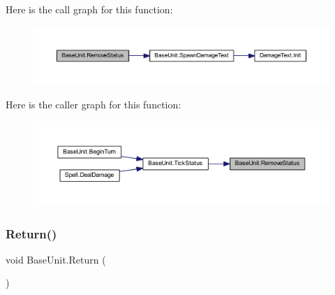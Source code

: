Here is the call graph for this function\+:
\nopagebreak
\begin{figure}[H]
\begin{center}
\leavevmode
\includegraphics[width=350pt]{class_base_unit_a15cf13fa9b4b776f474ad03b42939139_cgraph}
\end{center}
\end{figure}
Here is the caller graph for this function\+:
\nopagebreak
\begin{figure}[H]
\begin{center}
\leavevmode
\includegraphics[width=350pt]{class_base_unit_a15cf13fa9b4b776f474ad03b42939139_icgraph}
\end{center}
\end{figure}
\mbox{\label{class_base_unit_a3091e5ab7a6bd3488f9c0987208a1f4d}} 
\subsubsection{\texorpdfstring{Return()}{Return()}}
{\footnotesize\ttfamily void Base\+Unit.\+Return (\begin{DoxyParamCaption}{ }\end{DoxyParamCaption})}

